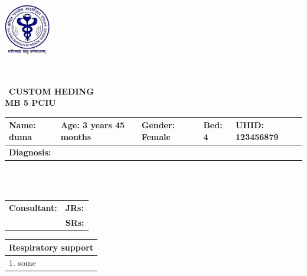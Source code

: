 \documentclass{article}
\begin{document}
\
\noindent
\begin{minipage}{0.2\textwidth} %
    \includegraphics[width=2cm]{RESOURCES/website_logo.png} %
\end{minipage}\
\vspace{-1cm} %
\hfill
\fontsize{7pt}{9pt}\selectfont %
\begin{center}\
    \textbf{CUSTOM HEDING} \\
    \textbf{MB 5 PCIU} \\
\end{center}
\fontsize{8pt}{9pt}\selectfont %
\noindent\begin{tabular}{|p{5cm}|p{4cm}|p{2.5cm}|p{1.5cm}|p{3cm}|}
    \hline
    \textbf{Name:} duma & \textbf{Age:} 3 years 45 months & \textbf{Gender:} Female & \textbf{Bed:} 4 & \textbf{UHID:} 123456879 \\
    \hline
    \multicolumn{5}{|p{19cm}|}{\textbf{Diagnosis:}  }\\
    \hline
\end{tabular}
\\
\\
\noindent\begin{tabular}{|p{11.3cm}|p{7.3cm}|}
     \hline
    \textbf{Consultant:}       & \textbf{JRs:}  \\
    \cline{2-2}
      & \textbf{SRs:}  \\
    \hline
\end{tabular}
\vspace{0.1cm} %
\noindent
\begin{minipage}[t]{0.45\textwidth}
\vspace{-1.50cm} %

    

    \begin{tabular}{|p{12cm}|}
        \hline
        \textbf{Respiratory support} \\
        \hline
       1. some \\
        \hline
    \end{tabular}
    \vspace{0.2cm}

\end{minipage}%
\end{document}
